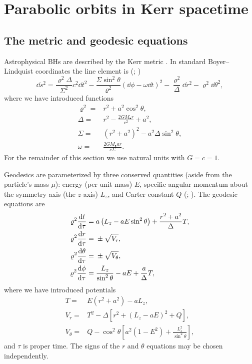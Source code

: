 \section{Parabolic orbits in Kerr spacetime}\label{sec:Geodesic}

\subsection{The metric and geodesic equations}

Astrophysical BHs are described by the Kerr metric \citep{Kerr1963}. In standard Boyer--Lindquist coordinates the line element is (\citealt{Boyer1967}; \citealt[section 13.7]{Hobson2006})
\begin{equation}
\dd s^2 = \frac{\varrho^2 \Delta}{\Sigma^2}c^2\dd t^2 - \frac{\Sigma \sin^2 \theta}{\varrho^2}\left(\dd \phi - \omega \dd t\right)^2 - \frac{\varrho^2}{\Delta}\dd r^2 - \varrho^2\dd \theta^2,
\end{equation}
where we have introduced functions
\begin{subequations}
\begin{align}
\varrho^2 = {} & r^2 + a^2\cos^2\theta,\\
\Delta = {} & r^2 - \frac{2GM_\bullet r}{c^2} + a^2,\\
\Sigma = {} & \left(r^2 +a^2\right)^2 - a^2\Delta\sin^2\theta,\\
\omega = {} & \frac{2GM_\bullet ar}{c\Sigma}.
\end{align}
\end{subequations}
For the remainder of this section we use natural units with $G = c = 1$.

Geodesics are parameterized by three conserved quantities (aside from the particle's mass $\mu$): energy (per unit mass) $E$, specific angular momentum about the symmetry axis (the $z$-axis) $L_z$, and Carter constant $Q$ (\citealt{Carter1968}; \citealt[section 62]{Chandrasekhar1992}). The geodesic equations are
\begin{subequations}
\begin{align}
\varrho^2 \frac{\mathrm{d} {t}}{\mathrm{d} {\tau}} = {} & a\left(L_z - aE\sin^2 \theta\right) + \frac{r^2 + a^2}{\Delta}T,\\
\varrho^2 \frac{\mathrm{d} {r}}{\mathrm{d} {\tau}} = {} & \pm \sqrt{V_r},\\
\varrho^2 \frac{\mathrm{d} {\theta}}{\mathrm{d} {\tau}} = {} & \pm \sqrt{V_\theta},\\
\varrho^2 \frac{\mathrm{d} {\phi}}{\mathrm{d} {\tau}} = {} & \frac{L_z}{\sin^2 \theta} - aE + \frac{a}{\Delta}T,
\end{align}
\end{subequations}
where we have introduced potentials
\begin{subequations}
\begin{align}
T = {} & E\left(r^2 +a^2\right) - aL_z,\\
V_r = {} & T^2 - \Delta\left[r^2 + \left(L_z - aE\right)^2 + Q\right],\\
V_\theta = {} & Q - \cos^2 \theta\left[a^2\left(1 - E^2\right) + \frac{L_z^2}{\sin^2\theta}\right],
\end{align}
\end{subequations}
and $\tau$ is proper time. The signs of the $r$ and $\theta$ equations may be chosen independently.

